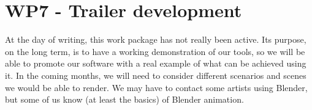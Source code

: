 \section{WP7 - Trailer development}

At the day of writing, this work package has not really been active. Its purpose, on the long term, is to have a working demonstration of our tools, so we will be able to promote our software with a real example of what can be achieved using it. In the coming months, we will need to consider different scenarios and scenes we would be able to render. We may have to contact some artists using Blender, but some of us know (at least the basics) of Blender animation.
